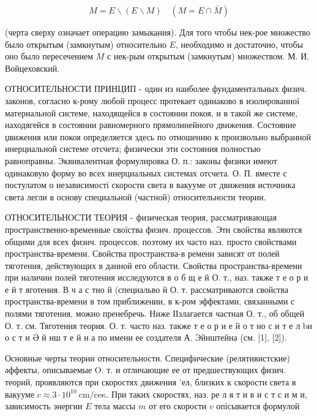 \documentclass[10pt]{article}
\begin{document}
\[

M=E \backslash(E \backslash M) \quad(M=E \cap \bar{M})

\]



(черта сверху означает операцию замыкания). Для того чтобы нек-рое множество было открытым (замкнутым) относительно $E$, необходимо и достаточно, чтобы оно было пересечением $M$ с нек-рым открытым (замкнутым) множеством. М. И. Войцеховский.



ОТНОСИТЕЛЬНОСТИ ПРИНЦИП - один из наиболее фундаментальных физич. законов, согласно к-рому любой процесс протекает одинаково в изолированної материальной системе, находящейся в состоянии покоя, и в такой же системе, находягейся в состоянии равномерного прямолинейного движения. Состояние џвижения или покоя определяется здесь по отношению к произвольно выбранной инерциальной системе отсчета; физически эти состояния полностью равноправны. Эквивалентная формулировка О. п.: законы физики имеют одинаковую форму во всех инерциальных системах отсчета. О. П. вместе с постулатом о независимості скорости света в вакууме от движения источника света легли в основу специальной (частной) относительности теории.



ОТНОСИТЕЛЬНОСТИ ТЕОРИЯ - физическая теория, рассматривающая пространственно-временные своїства физич. процессов. Эти свойства являются общими для всех физич. процессов, поэтому их часто наз. просто свойствами пространства-времени. Свойства пространства-в ремени зависят от полей тяготения, действующих в данной его области. Свойства пространства-времени при наличии полей тяготения исследуются в о б щ е й О. т., наз. также т е о р и е й т яготения. В ч а с тно й (специальво й О. т. рассматриваются свойства пространства-времени в том приближении, в к-ром эффектами, связанными с полями тяготения, можно пренебречь. Ниже ІІзлагается частная О. т., об общей О. т. см. Тяготения теория. О. т. часто наз. также т е о р и е й о т но с и т е л bн о с т и Ә й нш т е й н а по имени ее создателя А. Эйнштейна (см. [1], [2]).



Основные черты теории относительности. Специфические (релятивистские) әффекты, описываемые O. т. и отличающие ее от предшествующих физич. теорий, проявляются при скоростях движения 'ел, близких к скорости света в вакууме $c \approx 3 \cdot 10^{10} \mathrm{~cm} / \mathrm{ce \kappa}$. При таких скоростях, наз. ре л я т и в и с т с и м и, зависимость энергии $E$ тела массы $m$ от его скорости $v$ опісывается формулой
\end{document}
